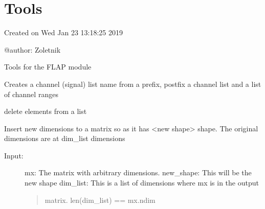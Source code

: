\documentclass[letterpaper,10pt,english]{sphinxmanual}
\begin{document}
\section{Tools}
\label{\detokenize{tools:module-flap.tools}}\label{\detokenize{tools:tools}}\label{\detokenize{tools::doc}}
Created on Wed Jan 23 13:18:25 2019

@author: Zoletnik

Tools for the FLAP module

\begin{fulllineitems}
\label{\detokenize{tools:flap.tools.chlist}}
Creates a channel (signal) list name from a prefix, postfix a channel list and a list of channel
ranges

\end{fulllineitems}


\begin{fulllineitems}
\label{\detokenize{tools:flap.tools.del_list_elements}}
delete elements from a list

\end{fulllineitems}


\begin{fulllineitems}
\label{\detokenize{tools:flap.tools.expand_matrix}}
Insert new dimensions to a matrix so as it has \textless{}new shape\textgreater{} shape.
The original dimensions are at dim\_list dimensions
\begin{description}
\item[{Input:}] \leavevmode
mx: The matrix with arbitrary dimensions.
new\_shape: This will be the new shape
dim\_list: This is a list of dimensions where mx is in the output
\begin{quote}

matrix. len(dim\_list) == mx.ndim
\end{quote}

\end{description}

\end{fulllineitems}
\end{document}
